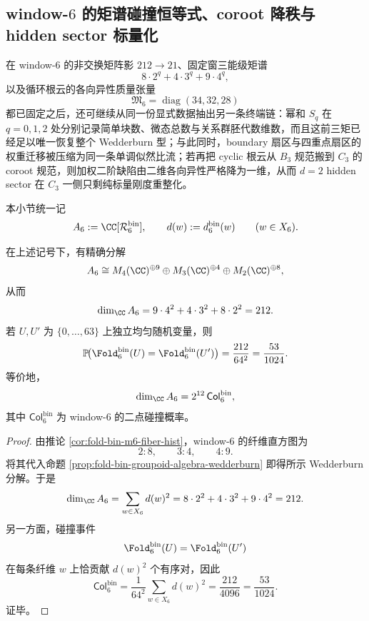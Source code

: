 \subsection{window-\texorpdfstring{$6$}{6} 的矩谱碰撞恒等式、coroot 降秩与 hidden sector 标量化}\label{subsec:conclusion-window6-moment-collision-coroot-scalarization}
在 window-\(6\) 的非交换矩阵影 \(212\to 21\)、固定窗三能级矩谱
\[
8\cdot 2^q+4\cdot 3^q+9\cdot 4^q,
\]
以及循环根云的各向异性质量张量
\[
\mathfrak M_6=\operatorname{diag}(34,32,28)
\]
都已固定之后，还可继续从同一份显式数据抽出另一条终端链：幂和 \(S_q\) 在 \(q=0,1,2\) 处分别记录简单块数、微态总数与关系群胚代数维数，而且这前三矩已经足以唯一恢复整个 Wedderburn 型；与此同时，boundary 扇区与四重点扇区的权重迁移被压缩为同一条单调似然比流；若再把 cyclic 根云从 \(B_3\) 规范搬到 \(C_3\) 的 coroot 规范，则加权二阶缺陷由二维各向异性严格降为一维，从而 \(d=2\) hidden sector 在 \(C_3\) 一侧只剩纯标量刚度重整化。

本小节统一记
\[
A_6:=\CC[\mathcal R_6^{\mathrm{bin}}],
\qquad
d(w):=d_6^{\mathrm{bin}}(w)\qquad (w\in X_6).
\]

\begin{theorem}\label{thm:conclusion-window6-groupoid-collision-dimension-identity}
在上述记号下，有精确分解
\[
A_6\cong M_4(\CC)^{\oplus 9}\oplus M_3(\CC)^{\oplus 4}\oplus M_2(\CC)^{\oplus 8},
\]
从而
\[
\dim_{\CC}A_6
=
9\cdot 4^2+4\cdot 3^2+8\cdot 2^2
=
212.
\]
若 \(U,U'\) 为 \(\{0,\dots,63\}\) 上独立均匀随机变量，则
\[
\mathbb P\!\bigl(\Fold_6^{\mathrm{bin}}(U)=\Fold_6^{\mathrm{bin}}(U')\bigr)
=
\frac{212}{64^2}
=
\frac{53}{1024}.
\]
等价地，
\[
\dim_{\CC}A_6
=
2^{12}\,\mathsf{Col}_6^{\mathrm{bin}},
\]
其中 \(\mathsf{Col}_6^{\mathrm{bin}}\) 为 window-\(6\) 的二点碰撞概率。
\end{theorem}
\begin{proof}
由推论 \ref{cor:fold-bin-m6-fiber-hist}，window-\(6\) 的纤维直方图为
\[
2:8,\qquad 3:4,\qquad 4:9.
\]
将其代入命题 \ref{prop:fold-bin-groupoid-algebra-wedderburn} 即得所示 Wedderburn 分解。于是
\[
\dim_{\CC}A_6=\sum_{w\in X_6}d(w)^2=8\cdot 2^2+4\cdot 3^2+9\cdot 4^2=212.
\]
另一方面，碰撞事件
\[
\Fold_6^{\mathrm{bin}}(U)=\Fold_6^{\mathrm{bin}}(U')
\]
在每条纤维 \(w\) 上恰贡献 \(d(w)^2\) 个有序对，因此
\[
\mathsf{Col}_6^{\mathrm{bin}}
=
\frac{1}{64^2}\sum_{w\in X_6}d(w)^2
=
\frac{212}{4096}
=
\frac{53}{1024}.
\]
证毕。
\end{proof}

